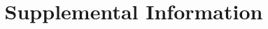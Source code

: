 %
%





\documentclass[12pt]{article}

\usepackage{amsmath}
\usepackage{graphicx}
\usepackage{float}
\usepackage{booktabs}
\usepackage{array}
\usepackage{multirow}
\usepackage{caption}
\usepackage{authblk}
\usepackage{natbib}

\title{Supplemental Information}
\date{}


	
\maketitle

\subsection{Model calibration parameters}
\label{sec:calibration-parameters}

